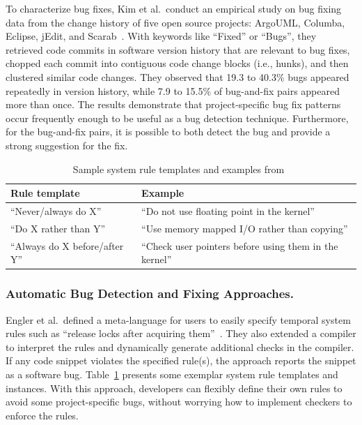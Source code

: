\documentclass[runningheads,a4paper]{llncs}
\begin{document}
To characterize bug fixes, Kim et al.~conduct an empirical study on bug fixing data from the change history of five open source projects: ArgoUML, Columba, Eclipse, jEdit, and Scarab~\cite{Kim2006:MBF}. With keywords like ``Fixed'' or ``Bugs'', they retrieved code commits in software version history that are relevant to bug fixes, chopped each commit into contiguous code change blocks (i.e., hunks), and then clustered similar code changes. They observed that 19.3 to 40.3\% bugs appeared repeatedly in version history, while 7.9 to 15.5\% of bug-and-fix pairs appeared more than once. The results demonstrate that project-specific bug fix patterns occur frequently enough to be useful as a bug detection technique. Furthermore, for the bug-and-fix pairs, it is possible to both detect the bug and provide a strong suggestion for the fix. 

\begin{table}[]
\centering
\caption{Sample system rule templates and examples from~\cite{Engler2000:CSR}}
\label{tab:rule}
\begin{tabular}{l|l}
\toprule
Rule template                  & Example                                                 \\ \hline
``Never/always do X''          & ``Do not use floating point in the kernel''             \\\hline
``Do X rather than Y''         & ``Use memory mapped I/O rather than copying''           \\ \hline
``Always do X before/after Y'' & ``Check user pointers before using them in the kernel''\\
\bottomrule
\end{tabular}
\end{table} 

\subsubsection{Automatic Bug Detection and Fixing Approaches.}
Engler et al.~defined a meta-language for users to easily specify temporal system rules such as ``release locks after acquiring them''~\cite{Engler2000:CSR}. They also extended a compiler to interpret the rules and dynamically generate additional checks in the compiler. If any code snippet violates the specified rule(s), the approach reports the snippet as a software bug. Table~\ref{tab:rule} presents some exemplar system rule templates and instances. 
With this approach, developers can flexibly define their own rules to avoid some project-specific bugs, without worrying how to implement checkers to enforce the rules.
\end{document}
